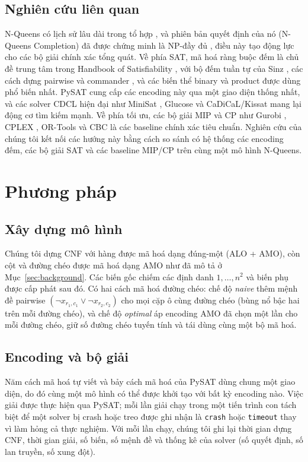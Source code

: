 \documentclass[a4paper,fleqn]{cas-sc}
\begin{document}
\subsection{Nghiên cứu liên quan}
N-Queens có lịch sử lâu dài trong tổ hợp \citep{BellStevens2009}, và phiên bản
quyết định của nó (N-Queens Completion) đã được chứng minh là NP-đầy đủ
\citep{Gent2017}, điều này tạo động lực cho các bộ giải chính xác tổng quát. Về
phía SAT, mã hoá ràng buộc đếm là chủ đề trung tâm trong Handbook of
Satisfiability \citep{Biere2021,Prestwich2009}, với bộ đếm tuần tự của Sinz
\citep{Sinz2005}, các cách dựng pairwise và commander
\citep{KlieberKwon2007}, và các biến thể binary và product
\citep{FrischGiannaros2010} được dùng phổ biến nhất. PySAT \citep{Ignatiev2018}
cung cấp các encoding này qua một giao diện thống nhất, và các solver CDCL hiện
đại như MiniSat \citep{EenSorensson2003}, Glucose \citep{AudemardSimon2009} và
CaDiCaL/Kissat \citep{Biere2020} mang lại động cơ tìm kiếm mạnh. Về phía tối ưu,
các bộ giải MIP và CP như Gurobi \citep{Gurobi2024}, CPLEX \citep{IBM2022},
OR-Tools \citep{ORtools2023} và CBC \citep{ForrestCBC} là các baseline chính xác
tiêu chuẩn. Nghiên cứu của chúng tôi kết nối các hướng này bằng cách so sánh có
hệ thống các encoding đếm, các bộ giải SAT và các baseline MIP/CP trên cùng một
mô hình N-Queens.

\section{Phương pháp}\label{sec:method}

\subsection{Xây dựng mô hình}
Chúng tôi dựng CNF với hàng được mã hoá dạng đúng-một (ALO + AMO), còn cột và
đường chéo được mã hoá dạng AMO như đã mô tả ở Mục~\ref{sec:background}. Các biến
gốc chiếm các định danh $1,\dots,n^2$ và biến phụ được cấp phát sau đó. Có hai
cách mã hoá đường chéo: chế độ \emph{naive} thêm mệnh đề pairwise
$(\neg x_{r_1,c_1} \vee \neg x_{r_2,c_2})$ cho mọi cặp ô cùng đường chéo (bùng nổ
bậc hai trên mỗi đường chéo), và chế độ \emph{optimal} áp encoding AMO đã chọn
một lần cho mỗi đường chéo, giữ số đường chéo tuyến tính và tái dùng cùng một bộ
mã hoá.

\subsection{Encoding và bộ giải}
Năm cách mã hoá tự viết và bảy cách mã hoá của PySAT dùng chung một giao diện, do
đó cùng một mô hình có thể được khởi tạo với bất kỳ encoding nào. Việc giải được
thực hiện qua PySAT; mỗi lần giải chạy trong một tiến trình con tách biệt để một
solver bị crash hoặc treo được ghi nhận là \texttt{crash} hoặc \texttt{timeout}
thay vì làm hỏng cả thực nghiệm. Với mỗi lần chạy, chúng tôi ghi lại thời gian
dựng CNF, thời gian giải, số biến, số mệnh đề và thống kê của solver (số quyết
định, số lan truyền, số xung đột).
\end{document}
